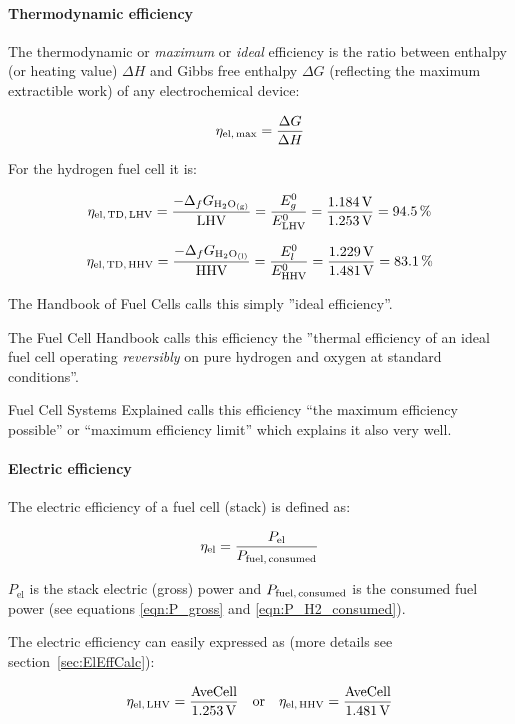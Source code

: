 \documentclass[11pt,a4paper,english,twoside]{scrreprt}
\begin{document}
\paragraph{Thermodynamic efficiency}

The thermodynamic or \textit{maximum} or \textit{ideal} efficiency is the ratio between enthalpy (or heating value) $\Delta H$ and Gibbs free enthalpy $\Delta G$ (reflecting the maximum extractible work) of any electrochemical device:

\[
	\eta _{\text{el,\,max}} =\frac{\Delta G}{\Delta H}
\]


For the hydrogen fuel cell it is:

\[
	\eta _{\text{el,\,TD,\,LHV}} =\frac{-\Delta_f G_{\ce{H2O_{(g)}}}}{\text{LHV}} =\frac{E_{g}^{0} }{E_\text{LHV}^{0} } = 
	\frac{\SI{1.184}{\volt}}{\SI{1.253}{\volt}} = \SI{94.5}{\percent}%
\]

\[
	\eta _{\text{el,\,TD,\,HHV}} =\frac{-\Delta_f G_{\ce{H2O_{(l)}}}}{\text{HHV}} =\frac{E_{l}^{0} }{E_\text{HHV}^{0} } = 
	\frac{\SI{1.229}{\volt}}{\SI{1.481}{\volt}} = \SI{83.1}{\percent}%
\]

The Handbook of Fuel Cells \cite{HFC} calls this simply ''ideal efficiency''.

The Fuel Cell Handbook \cite{FCHB} calls this efficiency the ''thermal efficiency of an ideal fuel cell operating \textit{reversibly} on pure hydrogen and oxygen at standard conditions''.

Fuel Cell Systems Explained \cite{FCSE} calls this efficiency ``the maximum efficiency possible'' or ``maximum efficiency limit'' which explains it also very well.


\paragraph{Electric efficiency}

The electric efficiency of a fuel cell (stack) is defined as:

\[
	\eta _{\text{el}} =\frac{P_{\text{el}} }{P_{\text{fuel,\,consumed}}} 
\]

$P_{\text{el}}$ is the stack electric (gross) power and $P_{\text{fuel,\,consumed}}$ is the consumed fuel power (see equations \ref{eqn:P_gross} and \ref{eqn:P_H2_consumed}).

The electric efficiency can easily expressed as (more details see section~\ref{sec:ElEffCalc}):

\begin{equation}
  \label{eqn:eta_el}
   \eta _{\text{el,\,LHV}} = \frac{\text{AveCell}}{\SI{1.253}{\volt}} \quad \mbox{or} \quad
   \eta _{\text{el,\,HHV}} = \frac{\text{AveCell}}{\SI{1.481}{\volt}}
\end{equation}
\end{document}
